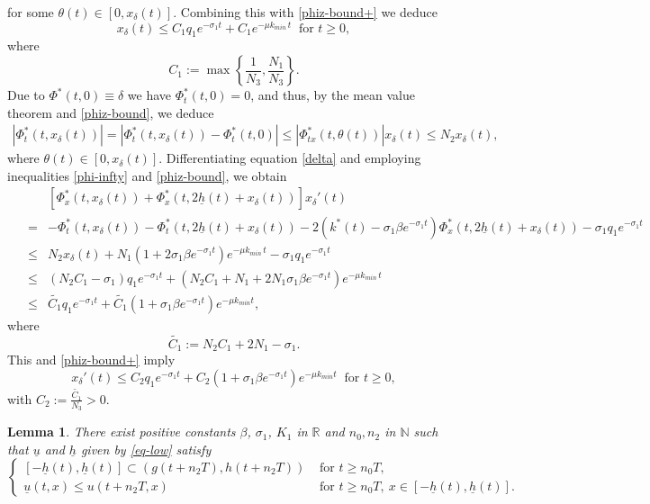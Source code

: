 \documentclass[11pt]{amsart}
\newtheorem{lemma}[theorem]{Lemma}
\numberwithin{equation}{section}
\begin{document}
for some  $\theta(t)\in[0,x_\delta(t)]$. Combining this  with  \eqref{phiz-bound+} we deduce 
\begin{equation}\label{eq-xdt}
  x_\delta(t)\leq C_1q_1e^{-\sigma_1t}+C_1 e^{-\mu  k_{min}\,t} ~\text{ for } t\geq 0, 
\end{equation}
where 
\begin{equation*}
  C_1:=\max\left\{\frac{1 }{N_3},\frac{N_1}{N_3}\right\}.
\end{equation*}
Due to $\Phi^*(t,0)\equiv\delta$ we have  $\Phi_t^*(t,0)=0$, and thus, by the  mean value theorem and  \eqref{phiz-bound},  we deduce 
\begin{eqnarray*}
  |\Phi_t^*(t,x_\delta(t))|=  |\Phi_t^*(t,x_\delta(t))-\Phi_t^*(t,0)|\leq |\Phi^*_{tx}(t,\theta(t))|x_\delta(t)\leq N_2x_\delta(t),
\end{eqnarray*}
where  $\theta(t)\in[0,x_\delta(t)]$. Differentiating equation \eqref{delta}  and employing inequalities \eqref{phi-infty} and \eqref{phiz-bound}, we obtain
\begin{eqnarray*}
  ~~&&[\Phi^*_x(t,x_\delta(t))+\Phi^*_x(t,2\underline{h}(t)+x_\delta(t))]x_\delta'(t)\\
  &=&-\Phi^*_t(t,x_\delta(t))-\Phi^*_t(t,2\underline{h}(t)+x_\delta(t))-2(k^*(t)-\sigma_1\beta e^{-\sigma_1t})\Phi^*_x(t,2\underline{h}(t)+x_\delta(t))-\sigma_1q_1e^{-\sigma_1t}\\
  &\leq&N_2x_\delta(t)+N_1(1+2\sigma_1\beta e^{-\sigma_1t})e^{-\mu  k_{min}\,t}-\sigma_1q_1e^{-\sigma_1t}\\
  &\leq & (N_2C_1-\sigma_1)q_1e^{-\sigma_1t}+(N_2C_1+N_1+2N_1\sigma_1\beta e^{-\sigma_1t})e^{-\mu  k_{min}\,t}\\
  &\leq &\tilde{C_1}q_1e^{-\sigma_1t}+\tilde{C_1}(1+\sigma_1\beta e^{-\sigma_1t})  e^{-\mu  k_{min}t},
\end{eqnarray*}
where 
\begin{equation*}
  \tilde{C_1}:=N_2C_1+2N_1-\sigma_1.
\end{equation*}
This and \eqref{phiz-bound+} imply 
\begin{equation}\label{eq-xdelta'}
  x_\delta'(t)\leq C_2q_1e^{-\sigma_1t}+C_2(1+\sigma_1\beta  e^{-\sigma_1t})  e^{-\mu  k_{min}t} ~\text{ for }t\geq 0,
\end{equation}
with  $C_2:=\frac{\tilde{C_1}}{N_3}>0$.
\begin{lemma}\label{lemma-lower}
  There exist positive constants $\beta$, $\sigma_1$, $K_1$ in $\mathbb R$ and  $n_0, n_2$ in $\mathbb{N}$ such that   $\underline{u}$ and $\underline{h}$  given by \eqref{eq-low} satisfy
  \begin{equation*}
    \begin{cases}
[-\underline{h}(t),\underline{h}(t)]\subset (g(t+n_2T),h(t+n_2T)) &\text{ for }t\geq  n_0T,\\
   \underline{u}(t,x)\leq u(t+n_2T,x) &\text{ for }t\geq n_0T, ~x\in[-\underline{h}(t), \underline{h}(t)].
    \end{cases}
  \end{equation*}
  \end{lemma}
\end{document}
